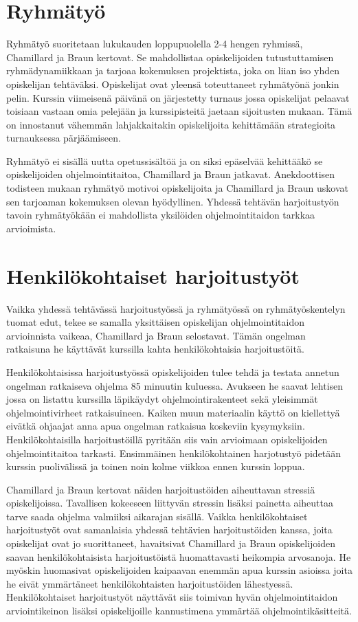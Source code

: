 \documentclass[finnish]{../tktltiki2}
\theoremstyle{definition}
\theoremstyle{remark}
\begin{document}
\section{Ryhmätyö}

Ryhmätyö suoritetaan lukukauden loppupuolella 2-4 hengen ryhmissä, Chamillard ja Braun kertovat. Se mahdollistaa opiskelijoiden tutustuttamisen ryhmädynamiikkaan ja tarjoaa kokemuksen projektista, joka on liian iso yhden opiskelijan tehtäväksi. Opiskelijat ovat yleensä toteuttaneet ryhmätyönä jonkin pelin. Kurssin viimeisenä päivänä on järjestetty turnaus jossa opiskelijat pelaavat toisiaan vastaan omia pelejään ja kurssipisteitä jaetaan sijoitusten mukaan. Tämä on innostanut vähemmän lahjakkaitakin opiskelijoita kehittämään strategioita turnauksessa pärjäämiseen.

Ryhmätyö ei sisällä uutta opetussisältöä ja on siksi epäselvää kehittääkö se opiskelijoiden ohjelmointitaitoa, Chamillard ja Braun jatkavat. Anekdoottisen todisteen mukaan ryhmätyö motivoi opiskelijoita ja Chamillard ja Braun uskovat sen tarjoaman kokemuksen olevan hyödyllinen. Yhdessä tehtävän harjoitustyön tavoin ryhmätyökään ei mahdollista yksilöiden ohjelmointitaidon tarkkaa arvioimista.

\section{Henkilökohtaiset harjoitustyöt}

Vaikka yhdessä tehtävässä harjoitustyössä ja ryhmätyössä on ryhmätyöskentelyn tuomat edut, tekee se samalla yksittäisen opiskelijan ohjelmointitaidon arvioinnista vaikeaa, Chamillard ja Braun selostavat. Tämän ongelman ratkaisuna he käyttävät kurssilla kahta henkilökohtaisia harjoitustöitä.

Henkilökohtaisissa harjoitustyössä opiskelijoiden tulee tehdä ja testata annetun ongelman ratkaiseva ohjelma 85 minuutin kuluessa. Avukseen he saavat lehtisen jossa on listattu kurssilla läpikäydyt ohjelmointirakenteet sekä yleisimmät ohjelmointivirheet ratkaisuineen. Kaiken muun materiaalin käyttö on kiellettyä eivätkä ohjaajat anna apua ongelman ratkaisua koskeviin kysymyksiin. Henkilökohtaisilla harjoitustöillä pyritään siis vain arvioimaan opiskelijoiden ohjelmointitaitoa tarkasti. Ensimmäinen henkilökohtainen harjotustyö pidetään kurssin puolivälissä ja toinen noin kolme viikkoa ennen kurssin loppua.

Chamillard ja Braun kertovat näiden harjoitustöiden aiheuttavan stressiä opiskelijoissa. Tavallisen kokeeseen liittyvän stressin lisäksi painetta aiheuttaa tarve saada ohjelma valmiiksi aikarajan sisällä. Vaikka henkilökohtaiset harjoitustyöt ovat samanlaisia yhdessä tehtävien harjoitustöiden kanssa, joita opiskelijat ovat jo suorittaneet, havaitsivat Chamillard ja Braun opiskelijoiden saavan henkilökohtaisista harjoitustöistä huomattavasti heikompia arvosanoja. He myöskin huomasivat opiskelijoiden kaipaavan enemmän apua kurssin asioissa joita he eivät ymmärtäneet henkilökohtaisten harjoitustöiden lähestyessä. Henkilökohtaiset harjoitustyöt näyttävät siis toimivan hyvän ohjelmointitaidon arviointikeinon lisäksi opiskelijoille kannustimena ymmärtää ohjelmointikäsitteitä.
\end{document}
